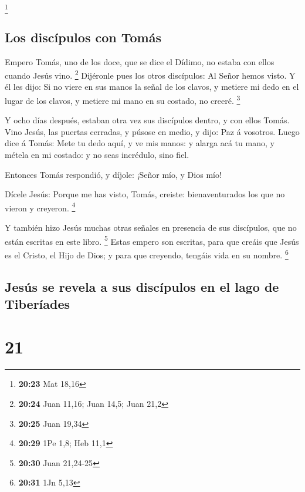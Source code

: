 \footnote{\textbf{20:23} Mat 18,16}

\hypertarget{los-discuxedpulos-con-tomuxe1s}{%
\subsection{Los discípulos con
Tomás}\label{los-discuxedpulos-con-tomuxe1s}}

 Empero Tomás, uno de los doce, que se dice el Dídimo, no
estaba con ellos cuando Jesús vino. \footnote{\textbf{20:24} Juan 11,16;
  Juan 14,5; Juan 21,2}  Dijéronle pues los otros
discípulos: Al Señor hemos visto. Y él les dijo: Si no viere en sus
manos la señal de los clavos, y metiere mi dedo en el lugar de los
clavos, y metiere mi mano en su costado, no creeré. \footnote{\textbf{20:25}
  Juan 19,34}

 Y ocho días después, estaban otra vez sus discípulos
dentro, y con ellos Tomás. Vino Jesús, las puertas cerradas, y púsose en
medio, y dijo: Paz á vosotros.  Luego dice á Tomás: Mete tu
dedo aquí, y ve mis manos: y alarga acá tu mano, y métela en mi costado:
y no seas incrédulo, sino fiel.

 Entonces Tomás respondió, y díjole: ¡Señor mío, y Dios
mío!

 Dícele Jesús: Porque me has visto, Tomás, creiste:
bienaventurados los que no vieron y creyeron. \footnote{\textbf{20:29}
  1Pe 1,8; Heb 11,1}

 Y también hizo Jesús muchas otras señales en presencia de
sus discípulos, que no están escritas en este libro. \footnote{\textbf{20:30}
  Juan 21,24-25}  Estas empero son escritas, para que
creáis que Jesús es el Cristo, el Hijo de Dios; y para que creyendo,
tengáis vida en su nombre. \footnote{\textbf{20:31} 1Jn 5,13}

\hypertarget{jesuxfas-se-revela-a-sus-discuxedpulos-en-el-lago-de-tiberuxedades}{%
\subsection{Jesús se revela a sus discípulos en el lago de
Tiberíades}\label{jesuxfas-se-revela-a-sus-discuxedpulos-en-el-lago-de-tiberuxedades}}

\hypertarget{section-20}{%
\section{21}\label{section-20}}

